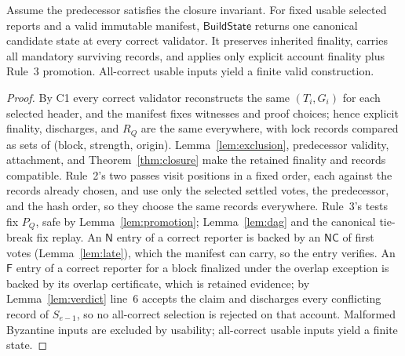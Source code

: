 \documentclass[conference]{IEEEtran}
\newcommand{\NC}{\mathsf{NC}}
\newcommand{\Build}{\mathsf{BuildState}}
\newcommand{\tagN}{\mathsf{N}}
\newcommand{\tagF}{\mathsf{F}}
\begin{document}
\begin{lemma}
\label{lem:construction}
Assume the predecessor satisfies the closure invariant. For fixed usable selected reports and a valid immutable manifest, $\Build$ returns one canonical candidate state at every correct validator. It preserves inherited finality, carries all mandatory surviving records, and applies only explicit account finality plus Rule~3 promotion. All-correct usable inputs yield a finite valid construction.
\end{lemma}
\begin{proof}
By C1 every correct validator reconstructs the same $(T_i,G_i)$ for each selected header, and the manifest fixes witnesses and proof choices; hence explicit finality, discharges, and $R_Q$ are the same everywhere, with lock records compared as sets of (block, strength, origin). Lemma~\ref{lem:exclusion}, predecessor validity, attachment, and Theorem~\ref{thm:closure} make the retained finality and records compatible. Rule~2's two passes visit positions in a fixed order, each against the records already chosen, and use only the selected settled votes, the predecessor, and the hash order, so they choose the same records everywhere. Rule~3's tests fix $P_Q$, safe by Lemma~\ref{lem:promotion}; Lemma~\ref{lem:dag} and the canonical tie-break fix replay. An $\tagN$ entry of a correct reporter is backed by an $\NC$ of first votes (Lemma~\ref{lem:late}), which the manifest can carry, so the entry verifies. An $\tagF$ entry of a correct reporter for a block finalized under the overlap exception is backed by its overlap certificate, which is retained evidence; by Lemma~\ref{lem:verdict} line~6 accepts the claim and discharges every conflicting record of $S_{e-1}$, so no all-correct selection is rejected on that account. Malformed Byzantine inputs are excluded by usability; all-correct usable inputs yield a finite state.
\end{proof}
\end{document}
